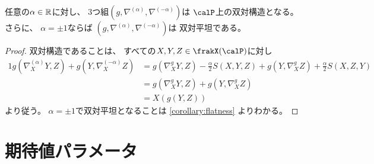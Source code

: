 \documentclass[report]{jlreq}
\begin{document}
\begin{theorem}
    任意の$\alpha \in \mathbb{R}$に対し、
    3つ組$(g, \nabla^{(\alpha)}, \nabla^{(-\alpha)})$は
    $\calP$上の双対構造となる。
    さらに、
    $\alpha = \pm 1$ならば
    $(g, \nabla^{(\alpha)}, \nabla^{(-\alpha)})$は
    双対平坦である。
\end{theorem}

\begin{proof}
    双対構造であることは、
    すべての$X, Y, Z \in \frakX(\calP)$に対し
    \begin{alignat}{1}
        g(\nabla^{(\alpha)}_X Y, Z)
            + g(Y, \nabla^{(-\alpha)}_X Z)
            &=
                g(\nabla^{g}_X Y, Z)
                - \frac{\alpha}{2} S(X, Y, Z)
                + g(Y, \nabla^{g}_X Z)
                + \frac{\alpha}{2} S(X, Z, Y)
                \\
            &=
                g(\nabla^{g}_X Y, Z)
                + g(Y, \nabla^{g}_X Z)
                \\
            &=
                X(g(Y, Z))
    \end{alignat}
    より従う。
    $\alpha = \pm 1$で双対平坦となることは
    \cref{corollary:flatness}
    よりわかる。
\end{proof}


%
\section{期待値パラメータ}


\end{document}
